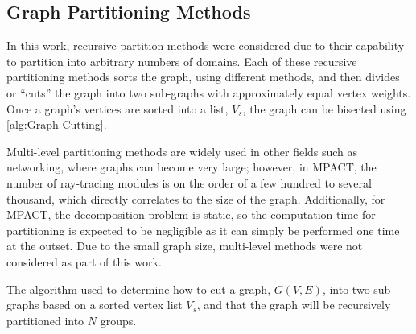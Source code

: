 {{    \subsection{Graph Partitioning Methods}{\label{ssec:Spatial Decomposition:Graph Partitioning Methods}
      In this work, recursive partition methods were considered due to their capability to partition into arbitrary numbers of domains.
      Each of these recursive partitioning methods sorts the graph, using different methods, and then divides or ``cuts'' the graph into two sub-graphs with approximately equal vertex weights.
      Once a graph's vertices are sorted into a list, $V_s$, the graph can be bisected using \cref{alg:Graph Cutting}.

      Multi-level partitioning methods are widely used in other fields such as networking, where graphs can become very large; however, in MPACT, the number of ray-tracing modules is on the order of a few hundred to several thousand, which directly correlates to the size of the graph.
      Additionally, for MPACT, the decomposition problem is static, so the computation time for partitioning is expected to be negligible as it can simply be performed one time at the outset.
      Due to the small graph size, multi-level methods were not considered as part of this work.

      \begin{algorithm}[ht]
        \centering
        \caption{The algorithm used to determine how to cut a graph, $G(V,E)$, into two sub-graphs based on a sorted vertex list $V_s$, and that the graph will be recursively partitioned into $N$ groups.}
        \label{alg:Graph Cutting}
        \begin{algorithmic}[1]
             
             
          \EndProcedure
        \end{algorithmic}
      \end{algorithm}
}}}
